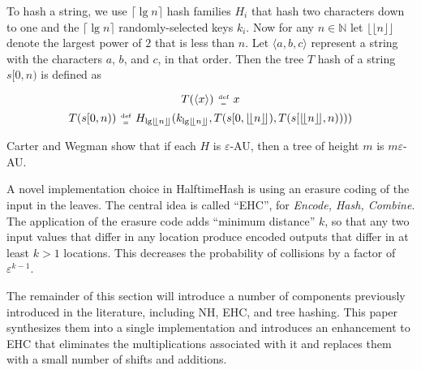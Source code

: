 \documentclass[runningheads]{llncs}
\newcommand{\nats}{\mathbb{N}}
\newcommand{\defeq}{\;\genfrac{}{}{0pt}{2}{\text{def}}{=}\;}
\begin{document}

To hash a string, we use $\lceil \lg n \rceil$ hash families $H_i$ that hash two characters down to one and the $\lceil \lg n \rceil$ randomly-selected keys $k_i$.
Now for any $n \in \nats$ let $\lfloor\!\lfloor n \rfloor\!\rfloor$ denote the largest power of $2$ that is less than $n$.
Let $\langle a,b,c \rangle$ represent a string with the characters $a$, $b$, and $c$, in that order.
Then the tree $T$ hash of a string $s[0,n)$ is defined as

\[
T(\langle x \rangle) \defeq x
\]
\begin{equation}
\label{algebraic-badger}
T(s[0,n)) \defeq H_{ \lg \lfloor\!\lfloor n \rfloor\!\rfloor}
(k_{ \lg \lfloor\!\lfloor n \rfloor\!\rfloor},
T(s[0,\lfloor\!\lfloor n \rfloor\!\rfloor),
  T(s[\lfloor\!\lfloor n \rfloor\!\rfloor, n) )))
\end{equation}

Carter and Wegman show that if each $H$ is $\varepsilon$-AU, then a tree of height $m$ is $m\varepsilon$-AU.

A novel implementation choice in HalftimeHash is using an erasure coding of the input in the leaves.
The central idea is called ``EHC'', for {\em Encode, Hash, Combine}. \cite{ehc-nandi}
The application of the erasure code adds ``minimum distance'' $k$, so that any two input values that differ in any location produce encoded outputs that differ in at least $k > 1$ locations.
This decreases the probability of collisions by a factor of $\varepsilon^{k-1}$.

The remainder of this section will introduce a number of components previously introduced in the literature, including NH, EHC, and tree hashing.
This paper synthesizes them into a single implementation and introduces an enhancement to EHC that eliminates the multiplications associated with it and replaces them with a small number of shifts and additions.
\end{document}
